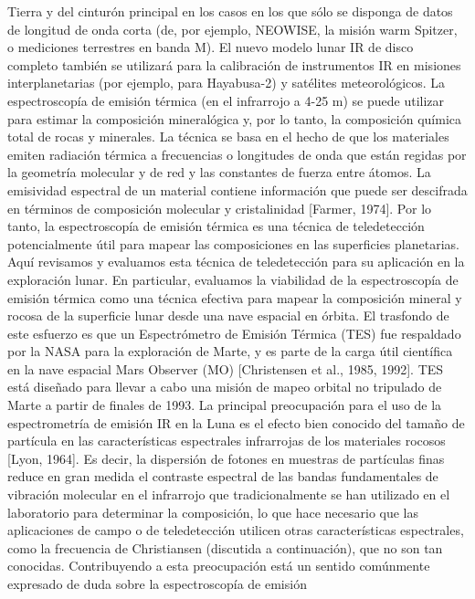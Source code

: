 \documentclass[12pt]{article}
\begin{document}
Tierra y del cinturón principal en los casos en los que sólo se disponga de datos de longitud 
de onda corta (de, por ejemplo, NEOWISE, la misión warm Spitzer, o mediciones terrestres en 
banda M). El nuevo modelo lunar IR de disco completo también se utilizará para la calibración 
de instrumentos IR en misiones interplanetarias (por ejemplo, para Hayabusa-2) y satélites 
meteorológicos.
La espectroscopía de emisión térmica (en el infrarrojo a 4-25 \textmu m) se puede utilizar 
para estimar la composición mineralógica y, por lo tanto, la composición química total de rocas 
y minerales. La técnica se basa en el hecho de que los materiales emiten radiación térmica a 
frecuencias o longitudes de onda que están regidas por la geometría molecular y de red y las 
constantes de fuerza entre átomos. La emisividad espectral de un material contiene información 
que puede ser descifrada en términos de composición molecular y cristalinidad [Farmer, 1974]. 
Por lo tanto, la espectroscopía de emisión térmica es una técnica de teledetección potencialmente 
útil para mapear las composiciones en las superficies planetarias. Aquí revisamos y evaluamos 
esta técnica de teledetección para su aplicación en la exploración lunar. En particular, 
evaluamos la viabilidad de la espectroscopía de emisión térmica como una técnica efectiva para 
mapear la composición mineral y rocosa de la superficie lunar desde una nave espacial en órbita. 
El trasfondo de este esfuerzo es que un Espectrómetro de Emisión Térmica (TES) fue respaldado por 
la NASA para la exploración de Marte, y es parte de la carga útil científica en la nave espacial 
Mars Observer (MO) [Christensen et al., 1985, 1992]. TES está diseñado para llevar a cabo una 
misión de mapeo orbital no tripulado de Marte a partir de finales de 1993. La principal preocupación 
para el uso de la espectrometría de emisión IR en la Luna es el efecto bien conocido del tamaño de 
partícula en las características espectrales infrarrojas de los materiales rocosos [Lyon, 1964]. 
Es decir, la dispersión de fotones en muestras de partículas finas reduce en gran medida el contraste 
espectral de las bandas fundamentales de vibración molecular en el infrarrojo que tradicionalmente 
se han utilizado en el laboratorio para determinar la composición, lo que hace necesario que las 
aplicaciones de campo o de teledetección utilicen otras características espectrales, como la 
frecuencia de Christiansen (discutida a continuación), que no son tan conocidas. Contribuyendo a 
esta preocupación está un sentido comúnmente expresado de duda sobre la espectroscopía de emisión 
\end{document}

